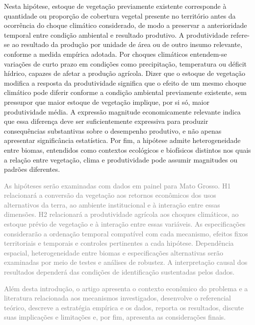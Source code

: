 \medskip



Nesta hipótese, estoque de vegetação previamente existente corresponde à quantidade ou proporção de cobertura vegetal presente no território antes da ocorrência do choque climático considerado, de modo a preservar a anterioridade temporal entre condição ambiental e resultado produtivo. A produtividade refere-se ao resultado da produção por unidade de área ou de outro insumo relevante, conforme a medida empírica adotada. Por choques climáticos entendem-se variações de curto prazo em condições como precipitação, temperatura ou déficit hídrico, capazes de afetar a produção agrícola. Dizer que o estoque de vegetação modifica a resposta da produtividade significa que o efeito de um mesmo choque climático pode diferir conforme a condição ambiental previamente existente, sem pressupor que maior estoque de vegetação implique, por si só, maior produtividade média. A expressão magnitude economicamente relevante indica que essa diferença deve ser suficientemente expressiva para produzir consequências substantivas sobre o desempenho produtivo, e não apenas apresentar significância estatística. Por fim, a hipótese admite heterogeneidade entre biomas, entendidos como contextos ecológicos e biofísicos distintos nos quais a relação entre vegetação, clima e produtividade pode assumir magnitudes ou padrões diferentes.

\medskip


\textcolor{gray}{As hipóteses serão examinadas com dados em painel para Mato Grosso. H1 relacionará a conversão da vegetação aos retornos econômicos dos usos alternativos da terra, ao ambiente institucional e à interação entre essas dimensões. H2 relacionará a produtividade agrícola aos choques climáticos, ao estoque prévio de vegetação e à interação entre essas variáveis. As especificações considerarão a ordenação temporal compatível com cada mecanismo, efeitos fixos territoriais e temporais e controles pertinentes a cada hipótese. Dependência espacial, heterogeneidade entre biomas e especificações alternativas serão examinadas por meio de testes e análises de robustez. A interpretação causal dos resultados dependerá das condições de identificação sustentadas pelos dados.}


\textcolor{gray}{Além desta introdução, o artigo apresenta o contexto econômico do problema e a literatura relacionada aos mecanismos investigados, desenvolve o referencial teórico, descreve a estratégia empírica e os dados, reporta os resultados, discute suas implicações e limitações e, por fim, apresenta as considerações finais.}
